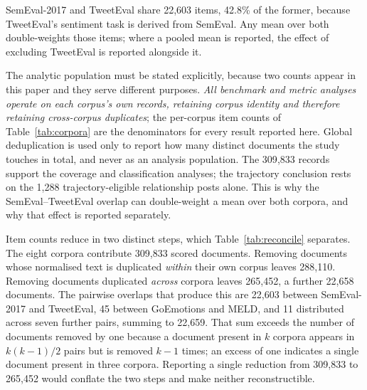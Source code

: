 \documentclass[fleqn,10pt]{wlscirep}
\begin{document}
SemEval-2017\cite{rosenthal2017} and TweetEval\cite{barbieri2020} share 22{,}603 items, 42.8\% of the former, because TweetEval's sentiment task is derived from SemEval. Any mean over both double-weights those items; where a pooled mean is reported, the effect of excluding TweetEval is reported alongside it.

The analytic population must be stated explicitly, because two counts appear in this paper and they serve different purposes. \emph{All benchmark and metric analyses operate on each corpus's own records, retaining corpus identity and therefore retaining cross-corpus duplicates}; the per-corpus item counts of Table~\ref{tab:corpora} are the denominators for every result reported here. Global deduplication is used only to report how many distinct documents the study touches in total, and never as an analysis population. The 309{,}833 records support the coverage and classification analyses; the trajectory conclusion rests on the 1{,}288 trajectory-eligible relationship posts alone. This is why the SemEval--TweetEval overlap can double-weight a mean over both corpora, and why that effect is reported separately.

Item counts reduce in two distinct steps, which Table~\ref{tab:reconcile} separates. The eight corpora contribute 309{,}833 scored documents. Removing documents whose normalised text is duplicated \emph{within} their own corpus leaves 288{,}110. Removing documents duplicated \emph{across} corpora leaves 265{,}452, a further 22{,}658 documents. The pairwise overlaps that produce this are 22{,}603 between SemEval-2017 and TweetEval, 45 between GoEmotions and MELD, and 11 distributed across seven further pairs, summing to 22{,}659. That sum exceeds the number of documents removed by one because a document present in $k$ corpora appears in $k(k-1)/2$ pairs but is removed $k-1$ times; an excess of one indicates a single document present in three corpora. Reporting a single reduction from 309{,}833 to 265{,}452 would conflate the two steps and make neither reconstructible.
\end{document}
